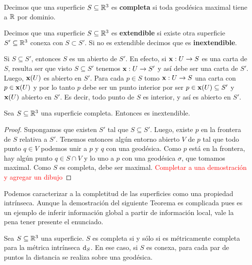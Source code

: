 \begin{defn}
Decimos que una superficie $S\subseteq\mathbb{R}^3$ es \textbf{completa} si toda geodésica maximal tiene a $\mathbb{R}$ por dominio.
\end{defn}

\begin{defn}
Decimos que una superficie $S\subseteq\mathbb{R}^3$ es \textbf{extendible} si existe otra superficie $S'\subseteq\mathbb{R}^3$ conexa con $S\subset S'$. Si no es extendible decimos que es \textbf{inextendible}.
\end{defn}

\begin{obs}
Si $S\subseteq S'$, entonces $S$ es un abierto de $S'$. En efecto, si $\operatorname{\mathbf{x}}:U\to S$ es una carta de $S$, resulta ser que visto $S\subseteq S'$ tenemos $\operatorname{\mathbf{x}}:U\to S'$ y así debe ser una carta de $S'$. Luego, $\operatorname{\mathbf{x}}(U)$ es abierto en $S'$. Para cada $p\in S$ tomo $\operatorname{\mathbf{x}}:U\to S$ una carta con $p\in\operatorname{\mathbf{x}}(U)$ y por lo tanto $p$ debe ser un punto interior por ser $p\in\operatorname{\mathbf{x}}(U)\subseteq S'$ y $\operatorname{\mathbf{x}}(U)$ abierto en $S'$. Es decir, todo punto de $S$ es interior, y así es abierto en $S'$.
\end{obs}

\begin{prop}
Sea $S\subseteq\mathbb{R}^3$ una superficie completa. Entonces es inextendible.
\begin{proof}
Supongamos que existen $S'$ tal que $S\subseteq S'$. Luego, existe $p$ en la frontera de $S$ relativa a $S'$. Tenemos entonces algún entorno abierto $V$ de $p$ tal que todo punto $q\in V$ podemos unir a $p$ y $q$ con una geodésica. Como $p$ está en la frontera, hay algún punto $q\in S\cap V$ y lo uno a $p$ con una geodésica $\sigma$, que tomamos maximal. Como $S$ es completa, debe ser maximal. \textcolor{red}{Completar a una demostración y agregar un dibujo}
\end{proof}
\end{prop}

Podemos caracterizar a la completitud de las superficies como una propiedad intrínseca. Aunque la demostración del siguiente Teorema es complicada pues es un ejemplo de inferir información global a partir de información local, vale la pena tener presente el enunciado.

\begin{teo}
Sea $S\subseteq\mathbb{R}^3$ una superficie. $S$ es completa si y sólo si es métricamente completa para la métrica intrínseca $\mathop{}\!\mathrm{d}_S$. En ese caso, si $S$ es conexa, para cada par de puntos la distancia se realiza sobre una geodésica.
\end{teo}

